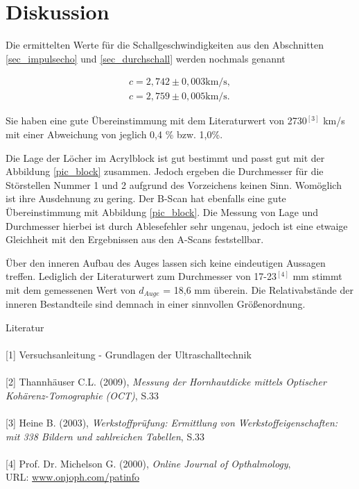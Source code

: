 \section{Diskussion}
Die ermittelten Werte für die Schallgeschwindigkeiten aus den Abschnitten \ref{sec_impulsecho} und \ref{sec_durchschall} werden 
nochmals genannt

\begin{align*}
  c = 2,742\pm0,003 \text{km/s},\\
  c = 2,759\pm0,005 \text{km/s}.
\end{align*}

Sie haben eine gute Übereinstimmung mit dem Literaturwert von 2730$^{[3]}$ km/s mit einer Abweichung von jeglich 0,4 \% bzw. 1,0\%. 

Die Lage der Löcher im Acrylblock ist gut bestimmt und passt gut mit der Abbildung \ref{pic_block} zusammen. Jedoch ergeben die Durchmesser
für die Störstellen Nummer 1 und 2 aufgrund des Vorzeichens keinen Sinn. Womöglich ist ihre Ausdehnung zu gering. Der B-Scan hat 
ebenfalls eine gute Übereinstimmung mit Abbildung \ref{pic_block}. Die Messung von Lage und Durchmesser hierbei ist durch Ablesefehler
sehr ungenau, jedoch ist eine etwaige Gleichheit mit den Ergebnissen aus den A-Scans feststellbar.

Über den inneren Aufbau des Auges lassen sich keine eindeutigen Aussagen treffen. Lediglich der Literaturwert zum Durchmesser von 
17-23$^{[4]}$ mm stimmt mit dem gemessenen Wert von $d_{Auge}$ = 18,6 mm überein. Die Relativabstände der inneren Bestandteile sind demnach
in einer sinnvollen Größenordnung.



\parskip 250pt
\Large{Literatur}\\\\
\large{[1] Versuchsanleitung - Grundlagen der Ultraschalltechnik}\\\\
\large{[2] Thannhäuser C.L. (2009), \textit{Messung der Hornhautdicke mittels Optischer Kohärenz-Tomographie (OCT)}, S.33}\\\\
\large{[3] Heine B. (2003), \textit{Werkstoffprüfung: Ermittlung von Werkstoffeigenschaften: mit 338 Bildern und zahlreichen Tabellen}, S.33}\\\\
\large{[4] Prof. Dr. Michelson G. (2000), \textit{Online Journal of Opthalmology}, \\URL: \href{http://www.onjoph.com/patinfo/funktion/zahlen.html}{www.onjoph.com/patinfo}}





